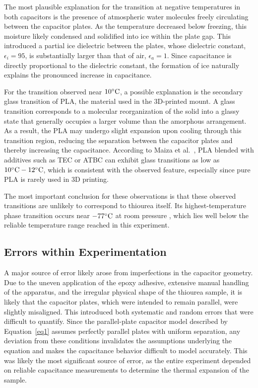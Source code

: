 \documentclass[letterpaper,12pt]{article}
\begin{document}
The most plausible explanation for the transition at negative temperatures in both capacitors is the presence of atmospheric water molecules freely circulating between the capacitor plates. As the temperature decreased below freezing, this moisture likely condensed and solidified into ice within the plate gap. This introduced a partial ice dielectric between the plates, whose dielectric constant, $\epsilon_i=95$, is substantially larger than that of air, $\epsilon_a=1$. Since capacitance is directly proportional to the dielectric constant, the formation of ice naturally explains the pronounced increase in capacitance.

For the transition observed near $10\degree \text{C}$, a possible explanation is the secondary glass transition of PLA, the material used in the 3D-printed mount. A glass transition corresponds to a molecular reorganization of the solid into a glassy state that generally occupies a larger volume than the amorphous arrangement. As a result, the PLA may undergo slight expansion upon cooling through this transition region, reducing the separation between the capacitor plates and thereby increasing the capacitance. According to Maiza et al.\ \cite{Maiza2015}, PLA blended with additives such as TEC or ATBC can exhibit glass transitions as low as $10\degree \text{C} - 12\degree \text{C}$, which is consistent with the observed feature, especially since pure PLA is rarely used in 3D printing.

The most important conclusion for these observations is that these observed transitions are unlikely to correspond to thiourea itself. Its highest-temperature phase transition occurs near $-77\degree \text{C}$ at room pressure \cite{Buescher2021}, which lies well below the reliable temperature range reached in this experiment.

\subsection{Errors within Experimentation}

A major source of error likely arose from imperfections in the capacitor geometry. Due to the uneven application of the epoxy adhesive, extensive manual handling of the apparatus, and the irregular physical shape of the thiourea sample, it is likely that the capacitor plates, which were intended to remain parallel, were slightly misaligned. This introduced both systematic and random errors that were difficult to quantify. Since the parallel-plate capacitor model described by Equation~\ref{eq1} assumes perfectly parallel plates with uniform separation, any deviation from these conditions invalidates the assumptions underlying the equation and makes the capacitance behavior difficult to model accurately. This was likely the most significant source of error, as the entire experiment depended on reliable capacitance measurements to determine the thermal expansion of the sample.
\end{document}
